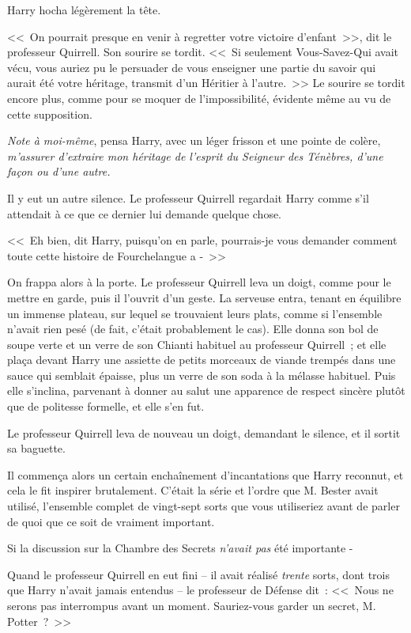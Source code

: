 Harry hocha légèrement la tête.

<<~On pourrait presque en venir à regretter votre victoire d'enfant~>>, dit le professeur Quirrell. Son sourire se tordit. <<~Si seulement Vous-Savez-Qui avait vécu, vous auriez pu le persuader de vous enseigner une partie du savoir qui aurait été votre héritage, transmit d'un Héritier à l'autre.~>> Le sourire se tordit encore plus, comme pour se moquer de l'impossibilité, évidente même au vu de cette supposition.

\emph{Note à moi-même}, pensa Harry, avec un léger frisson et une pointe de colère, \emph{m'assurer d'extraire mon héritage de l'esprit du Seigneur des Ténèbres, d'une façon ou d'une autre.}

Il y eut un autre silence. Le professeur Quirrell regardait Harry comme s'il attendait à ce que ce dernier lui demande quelque chose.

<<~Eh bien, dit Harry, puisqu'on en parle, pourrais-je vous demander comment toute cette histoire de Fourchelangue a -~>>

On frappa alors à la porte. Le professeur Quirrell leva un doigt, comme pour le mettre en garde, puis il l'ouvrit d'un geste. La serveuse entra, tenant en équilibre un immense plateau, sur lequel se trouvaient leurs plats, comme si l'ensemble n'avait rien pesé (de fait, c'était probablement le cas). Elle donna son bol de soupe verte et un verre de son Chianti habituel au professeur Quirrell~; et elle plaça devant Harry une assiette de petits morceaux de viande trempés dans une sauce qui semblait épaisse, plus un verre de son soda à la mélasse habituel. Puis elle s'inclina, parvenant à donner au salut une apparence de respect sincère plutôt que de politesse formelle, et elle s'en fut.

Le professeur Quirrell leva de nouveau un doigt, demandant le silence, et il sortit sa baguette.

Il commença alors un certain enchaînement d'incantations que Harry reconnut, et cela le fit inspirer brutalement. C'était la série et l'ordre que M. Bester avait utilisé, l'ensemble complet de vingt-sept sorts que vous utiliseriez avant de parler de quoi que ce soit de vraiment important.

Si la discussion sur la Chambre des Secrets \emph{n'avait pas} été importante -

Quand le professeur Quirrell en eut fini -- il avait réalisé \emph{trente} sorts, dont trois que Harry n'avait jamais entendus -- le professeur de Défense dit~: <<~Nous ne serons pas interrompus avant un moment. Sauriez-vous garder un secret, M. Potter~?~>>

